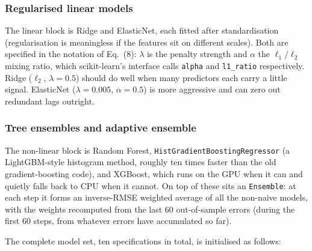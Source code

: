 \subsubsection{Regularised linear models}

The linear block is Ridge and ElasticNet, each fitted after standardisation (regularisation is meaningless if the features sit on different scales). Both are specified in the notation of Eq.~(8): $\lambda$ is the penalty strength and $\alpha$ the $\ell_1/\ell_2$ mixing ratio, which scikit-learn's interface calls \texttt{alpha} and \texttt{l1\_ratio} respectively. Ridge ($\ell_2$, $\lambda = 0.5$) should do well when many predictors each carry a little signal. ElasticNet ($\lambda = 0.005$, $\alpha = 0.5$) is more aggressive and can zero out redundant lags outright.

\subsubsection{Tree ensembles and adaptive ensemble}

The non-linear block is Random Forest, \texttt{HistGradientBoostingRegressor} (a LightGBM-style histogram method, roughly ten times faster than the old gradient-boosting code), and XGBoost, which runs on the GPU when it can and quietly falls back to CPU when it cannot. On top of these sits an \texttt{Ensemble}: at each step it forms an inverse-RMSE weighted average of all the non-naive models, with the weights recomputed from the last 60 out-of-sample errors (during the first 60 steps, from whatever errors have accumulated so far).

The complete model set, ten specifications in total, is initialised as follows:

